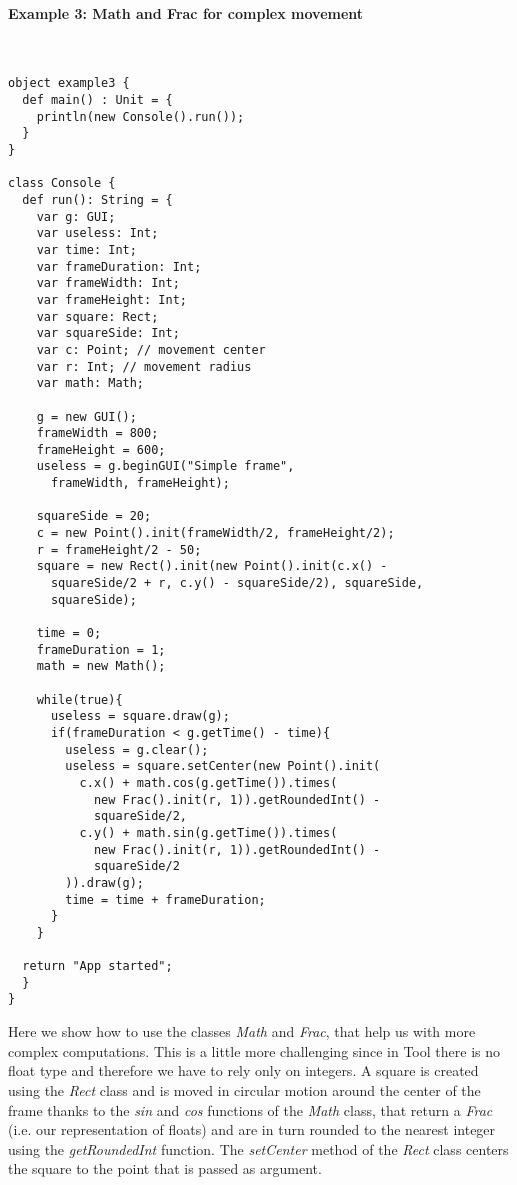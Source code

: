 \paragraph{Example 3: Math and Frac for complex movement}\mbox{}\\
\begin{lstlisting}
object example3 {
  def main() : Unit = {
    println(new Console().run());     
  }
}

class Console {
  def run(): String = {
    var g: GUI;
    var useless: Int;
    var time: Int;
    var frameDuration: Int;
    var frameWidth: Int;
    var frameHeight: Int;
    var square: Rect;
    var squareSide: Int;
    var c: Point; // movement center
    var r: Int; // movement radius
    var math: Math;
		
    g = new GUI();
    frameWidth = 800;
    frameHeight = 600;
    useless = g.beginGUI("Simple frame",
      frameWidth, frameHeight);

    squareSide = 20;
    c = new Point().init(frameWidth/2, frameHeight/2);
    r = frameHeight/2 - 50;
    square = new Rect().init(new Point().init(c.x() -
      squareSide/2 + r, c.y() - squareSide/2), squareSide,
      squareSide);

    time = 0;
    frameDuration = 1;
    math = new Math();

    while(true){
      useless = square.draw(g);
      if(frameDuration < g.getTime() - time){
        useless = g.clear();
        useless = square.setCenter(new Point().init(
          c.x() + math.cos(g.getTime()).times(
            new Frac().init(r, 1)).getRoundedInt() -
            squareSide/2,
          c.y() + math.sin(g.getTime()).times(
            new Frac().init(r, 1)).getRoundedInt() -
            squareSide/2
        )).draw(g);
        time = time + frameDuration;
      }
    }
		
  return "App started";
  }
}
\end{lstlisting}

Here we show how to use the classes \textit{Math} and \textit{Frac}, that help us with more complex computations.
This is a little more challenging since in Tool there is no float type and therefore we have to rely only on integers.
A square is created using the \textit{Rect} class and is moved in circular motion around the center of the frame thanks to the \textit{sin} and \textit{cos} functions of the \textit{Math} class, that return a \textit{Frac} (i.e. our representation of floats) and are in turn rounded to the nearest integer using the \textit{getRoundedInt} function.
The \textit{setCenter} method of the \textit{Rect} class centers the square to the point that is passed as argument.

